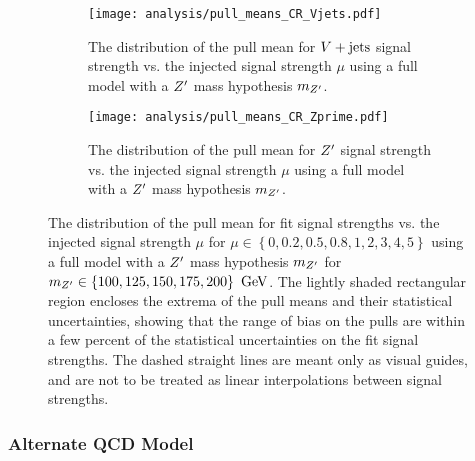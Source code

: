 \begin{figure}[htbp]
 \centering
 \begin{subfigure}[t]{0.48\textwidth}
  \centering
  \texttt{[image: analysis/pull\_means\_CR\_Vjets.pdf]}
  \caption[The distribution of the pull mean for $\Vjets$ signal strength vs. the injected signal strength $\mu$ using a full model with a $\Zprime$ mass hypothesis $m_{\Zprime}$.]{%
   The distribution of the pull mean for $\Vjets$ signal strength vs. the injected signal strength $\mu$ using a full model with a $\Zprime$ mass hypothesis $m_{\Zprime}$.}
  \label{fig:pull_means_CR_Vjets}
 \end{subfigure}%
 \quad
 \begin{subfigure}[t]{0.48\textwidth}
  \centering
  \texttt{[image: analysis/pull\_means\_CR\_Zprime.pdf]}
  \caption[The distribution of the pull mean for $\Zprime$ signal strength vs. the injected signal strength $\mu$ using a full model with a $\Zprime$ mass hypothesis $m_{\Zprime}$.]{%
   The distribution of the pull mean for $\Zprime$ signal strength vs. the injected signal strength $\mu$ using a full model with a $\Zprime$ mass hypothesis $m_{\Zprime}$.}
  \label{fig:pull_means_CR_Zprime}
 \end{subfigure}
 \caption[The distribution of the pull mean for fit signal strengths vs. the injected signal strength $\mu$ using a full model with a $\Zprime$ mass hypothesis $m_{\Zprime}$.]{%
  The distribution of the pull mean for fit signal strengths vs. the injected signal strength $\mu$ for $\mu \in \left\{0, 0.2, 0.5, 0.8, 1, 2, 3, 4, 5\right\}$ using a full model with a $\Zprime$ mass hypothesis $m_{\Zprime}$ for $m_{Z'} \in \left\{100, 125, 150, 175, 200\right\}~\mathrm{GeV}$.
  The lightly shaded rectangular region encloses the extrema of the pull means and their statistical uncertainties, showing that the range of bias on the pulls are within a few percent of the statistical uncertainties on the fit signal strengths.
  The dashed straight lines are meant only as visual guides, and are not to be treated as linear interpolations between signal strengths.}
 \label{fig:pulls_summary}
\end{figure}

\subsubsection{Alternate QCD Model}

